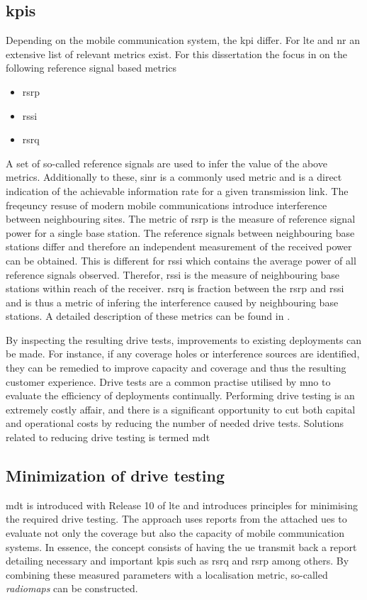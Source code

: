 \subsection{\glspl{kpi}}
Depending on the mobile communication system, the \gls{kpi} differ. For \gls{lte} and \gls{nr} an extensive list of relevant metrics exist. For this dissertation the focus in on the following reference signal based metrics
\begin{itemize}
    \item \gls{rsrp}
    \item \gls{rssi}
    \item \gls{rsrq}
\end{itemize}

A set of so-called reference signals are used to infer the value of the above metrics. Additionally to these, \gls{sinr} is a commonly used metric and is a direct indication of the achievable information rate for a given transmission link. The freqeuncy resuse of modern mobile communications introduce interference between neighbouring sites. The metric of \gls{rsrp} is the measure of reference signal power for a single base station. The reference signals between neighbouring base stations differ and therefore an independent measurement of the received power can be obtained. This is different for \gls{rssi} which contains the average power of all reference signals observed. Therefor, \gls{rssi} is the measure of neighbouring base stations within reach of the receiver. \gls{rsrq} is fraction between the \gls{rsrp} and \gls{rssi} and is thus a metric of infering the interference caused by neighbouring base stations. A detailed description of these metrics can be found in \cite{Molisch2007}.

By inspecting the resulting drive tests, improvements to existing deployments can be made. For instance, if any coverage holes or interference sources are identified, they can be remedied to improve capacity and coverage and thus the resulting customer experience. Drive tests are a common practise utilised by \gls{mno} to evaluate the efficiency of deployments continually. Performing drive testing is an extremely costly affair, and there is a significant opportunity to cut both capital and operational costs by reducing the number of needed drive tests. Solutions related to reducing drive testing is termed \gls{mdt}


\subsection{Minimization of drive testing}
\gls{mdt} is introduced with Release 10 of \gls{lte} and introduces principles for minimising the required drive testing. The approach uses reports from the attached \glspl{ue} to evaluate not only the coverage but also the capacity of mobile communication systems. In essence, the concept consists of having the \gls{ue} transmit back a report detailing necessary and important \glspl{kpi} such as \gls{rsrq} and \gls{rsrp} among others. By combining these measured parameters with a localisation metric, so-called \emph{radiomaps} can be constructed. 

